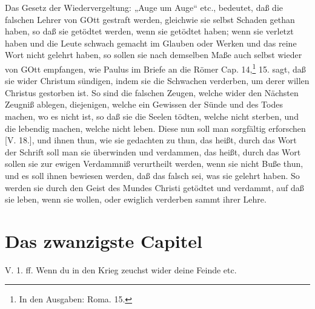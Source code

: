 Das Gesetz der Wiedervergeltung: „Auge um Auge“ etc., bedeutet, daß die falschen Lehrer von GOtt gestraft werden, gleichwie sie selbst Schaden gethan haben, so daß sie getödtet werden, wenn sie getödtet haben; wenn sie verletzt haben und die Leute schwach gemacht im Glauben oder Werken und das reine Wort nicht gelehrt haben, so sollen sie nach demselben Maße auch selbst wieder von GOtt empfangen, wie Paulus im Briefe an die Römer Cap. 14,\footnote{In den Ausgaben: Roma. 15.} 15. sagt, daß sie wider Christum sündigen, indem sie die Schwachen verderben, um derer willen Christus gestorben ist. So sind die falschen Zeugen, welche wider den Nächsten Zeugniß ablegen, diejenigen, welche ein Gewissen der Sünde und des Todes machen, wo es nicht ist, so daß sie die Seelen tödten, welche nicht sterben, und
die lebendig machen, welche nicht leben. Diese nun soll man sorgfältig erforschen [V. 18.], und ihnen thun, wie sie gedachten zu thun, das heißt, durch das Wort der Schrift soll man sie überwinden und verdammen, das heißt, durch das Wort sollen sie zur ewigen Verdammniß verurtheilt werden, wenn sie nicht Buße thun, und es soll ihnen bewiesen werden, daß das falsch sei, was sie gelehrt haben. So werden sie durch den Geist des Mundes Christi getödtet und verdammt, auf daß sie leben, wenn sie wollen, oder ewiglich verderben sammt ihrer Lehre.

\section{Das zwanzigste Capitel}

\begin{schriftzitat}
V. 1. ff. Wenn du in den Krieg zeuchst wider deine Feinde etc.
\end{schriftzitat}

